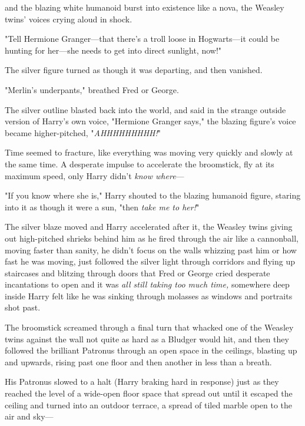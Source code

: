 and the blazing white humanoid burst into existence like a nova, the Weasley
twins' voices crying aloud in shock.

"Tell Hermione Granger---that there's a troll loose in Hogwarts---it could be
hunting for her---she needs to get into direct sunlight, now!"

The silver figure turned as though it was departing, and then vanished.

"Merlin's underpants," breathed Fred or George.

The silver outline blasted back into the world, and said in the strange outside
version of Harry's own voice, "Hermione Granger says," the blazing figure's
voice became higher-pitched, "\emph{AHHHHHHHHH!}"

Time seemed to fracture, like everything was moving very quickly and slowly at
the same time. A desperate impulse to accelerate the broomstick, fly at its
maximum speed, only Harry didn't \emph{know where}---

"If you know where she is," Harry shouted to the blazing humanoid figure,
staring into it as though it were a sun, "then \emph{take me to her!}"

The silver blaze moved and Harry accelerated after it, the Weasley twins giving
out high-pitched shrieks behind him as he fired through the air like a
cannonball, moving faster than sanity, he didn't focus on the walls whizzing
past him or how fast he was moving, just followed the silver light through
corridors and flying up staircases and blitzing through doors that Fred or
George cried desperate incantations to open and it was \emph{all still taking
too much time,} somewhere deep inside Harry felt like he was sinking through
molasses as windows and portraits shot past.

The broomstick screamed through a final turn that whacked one of the Weasley
twins against the wall not quite as hard as a Bludger would hit, and then they
followed the brilliant Patronus through an open space in the ceilings, blasting
up and upwards, rising past one floor and then another in less than a breath.

His Patronus slowed to a halt (Harry braking hard in response) just as they
reached the level of a wide-open floor space that spread out until it
escaped the ceiling and turned into an outdoor terrace, a spread of tiled
marble open to the air and sky---
